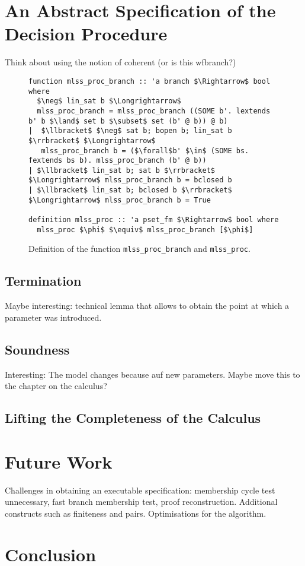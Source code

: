 \documentclass[sigplan,10pt,anonymous,review]{acmart}
\begin{document}
\section{An Abstract Specification of the Decision Procedure}
Think about using the notion of coherent (or is this wfbranch?)
\begin{figure*}
  \centering
\begin{lstlisting}
function mlss_proc_branch :: 'a branch $\Rightarrow$ bool where
  $\neg$ lin_sat b $\Longrightarrow$
  mlss_proc_branch = mlss_proc_branch ((SOME b'. lextends b' b $\land$ set b $\subset$ set (b' @ b)) @ b)
|  $\llbracket$ $\neg$ sat b; bopen b; lin_sat b $\rrbracket$ $\Longrightarrow$
   mlss_proc_branch b = ($\forall$b' $\in$ (SOME bs. fextends bs b). mlss_proc_branch (b' @ b))
| $\llbracket$ lin_sat b; sat b $\rrbracket$ $\Longrightarrow$ mlss_proc_branch b = bclosed b
| $\llbracket$ lin_sat b; bclosed b $\rrbracket$ $\Longrightarrow$ mlss_proc_branch b = True

definition mlss_proc :: 'a pset_fm $\Rightarrow$ bool where
  mlss_proc $\phi$ $\equiv$ mlss_proc_branch [$\phi$]
\end{lstlisting}
\caption{Definition of the function \lstinline|mlss_proc_branch| and \lstinline|mlss_proc|.}
\end{figure*}

\subsection{Termination}
Maybe interesting: technical lemma that allows to obtain the point at which a parameter was introduced.
\subsection{Soundness}
Interesting: The model changes because auf new parameters.
Maybe move this to the chapter on the calculus?
\subsection{Lifting the Completeness of the Calculus}

\section{Future Work}
Challenges in obtaining an executable specification: membership cycle test unnecessary, fast branch membership test, proof reconstruction.
Additional constructs such as finiteness and pairs.
Optimisations for the algorithm.

\section{Conclusion}

\begin{acks}
\end{acks}



\end{document}
